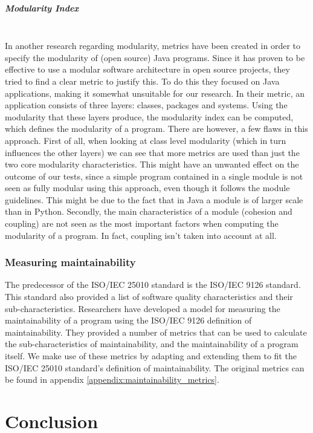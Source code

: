 \documentclass[twoside]{uva-inf-bachelor-thesis}
\newcommand{\myparagraph}[1]{\paragraph{#1}\mbox{}\\}
\begin{document}
\myparagraph{Modularity Index}
In another research regarding modularity, metrics have been created in order to specify the modularity of (open source) Java programs\cite{emanuel2013modularity}. Since it has proven to be effective to use a modular software architecture in open source projects, they tried to find a clear metric to justify this. To do this they focused on Java applications, making it somewhat unsuitable for our research. In their metric, an application consists of three layers: classes, packages and systems. Using the modularity that these layers produce, the modularity index can be computed, which defines the modularity of a program. There are however, a few flaws in this approach. First of all, when looking at class level modularity (which in turn influences the other layers) we can see that more metrics are used than just the two core modularity characteristics. This might have an unwanted effect on the outcome of our tests, since a simple program contained in a single module is not seen as fully modular using this approach, even though it follows the module guidelines. This might be due to the fact that in Java a module is of larger scale than in Python. Secondly, the main characteristics of a module (cohesion and coupling) are not seen as the most important factors when computing the modularity of a program. In fact, coupling isn't taken into account at all.

\subsection*{Measuring maintainability}
The predecessor of the ISO/IEC 25010 standard is the ISO/IEC 9126 standard\cite{ISO9126}. This standard also provided a list of software quality characteristics and their sub-characteristics. Researchers have developed a model for measuring the maintainability of a program using the ISO/IEC 9126 definition of maintainability\cite{heitlager2016practical}. They provided a number of metrics that can be used to calculate the sub-characteristics of maintainability, and the maintainability of a program itself. We make use of these metrics by adapting and extending them to fit the ISO/IEC 25010 standard's definition of maintainability. The original metrics can be found in appendix \ref{appendix:maintainability_metrics}.

\chapter{Conclusion}
\end{document}
